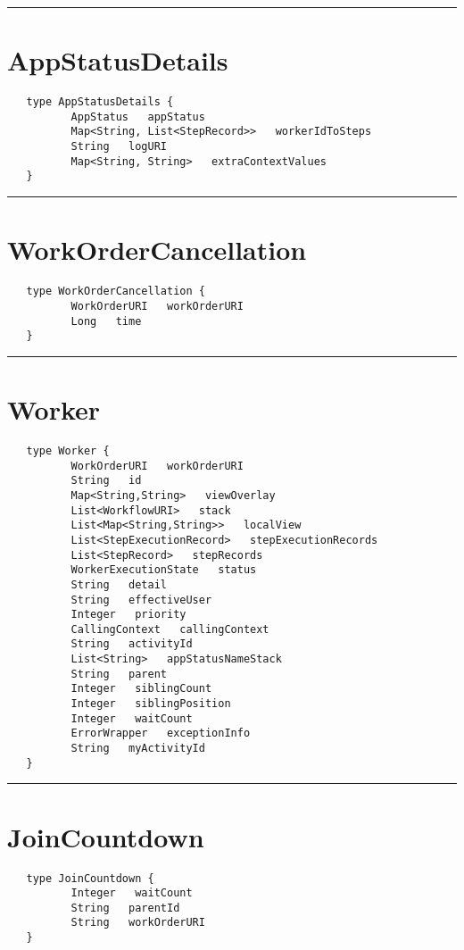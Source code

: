 \rule{15cm}{2pt}
\section{AppStatusDetails}
\label{type:AppStatusDetails}

\begin{verbatim}
   type AppStatusDetails {
          AppStatus   appStatus
          Map<String, List<StepRecord>>   workerIdToSteps
          String   logURI
          Map<String, String>   extraContextValues
   }
\end{verbatim}

\rule{15cm}{2pt}
\section{WorkOrderCancellation}
\label{type:WorkOrderCancellation}

\begin{verbatim}
   type WorkOrderCancellation {
          WorkOrderURI   workOrderURI
          Long   time
   }
\end{verbatim}

\rule{15cm}{2pt}
\section{Worker}
\label{type:Worker}

\begin{verbatim}
   type Worker {
          WorkOrderURI   workOrderURI
          String   id
          Map<String,String>   viewOverlay
          List<WorkflowURI>   stack
          List<Map<String,String>>   localView
          List<StepExecutionRecord>   stepExecutionRecords
          List<StepRecord>   stepRecords
          WorkerExecutionState   status
          String   detail
          String   effectiveUser
          Integer   priority
          CallingContext   callingContext
          String   activityId
          List<String>   appStatusNameStack
          String   parent
          Integer   siblingCount
          Integer   siblingPosition
          Integer   waitCount
          ErrorWrapper   exceptionInfo
          String   myActivityId
   }
\end{verbatim}

\rule{15cm}{2pt}
\section{JoinCountdown}
\label{type:JoinCountdown}

\begin{verbatim}
   type JoinCountdown {
          Integer   waitCount
          String   parentId
          String   workOrderURI
   }
\end{verbatim}

